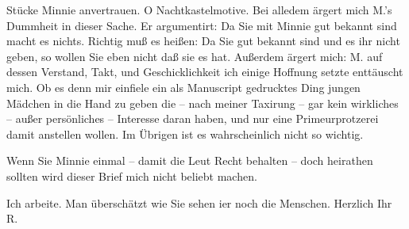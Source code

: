                Stücke Minnie anvertrauen. O
               Nachtkastelmotive. Bei alledem ärgert mich M.’s Dummheit in dieser Sache. Er argumentirt: Da Sie mit Minnie gut {\pb}bekannt sind macht es nichts. Richtig muß es heißen: Da Sie gut bekannt sind und es
               ihr nicht geben, so wollen Sie eben nicht daß sie es hat. Außerdem ärgert mich: M. auf dessen Verstand, Takt, und
               Geschicklichkeit ich einige Hoffnung setzte enttäuscht mich. Ob es denn mir einfiele
               ein als Manuscript gedrucktes Ding jungen Mädchen in die Hand zu geben die – nach meiner Taxirung –
               gar kein wirkliches – außer persönliches – Interesse daran haben, und nur eine
               Primeurprotzerei damit anstellen wollen. Im Übrigen ist es wahrscheinlich nicht so
               wichtig.\pend
           
\pstart
           Wenn Sie Minnie einmal – damit die Leut Recht
               behalten – doch heirathen sollten wird dieser Brief mich nicht beliebt machen.\pend
           
\pstart
           Ich arbeite. Man überschätzt wie Sie sehen i{\geminationm}er noch die
               Menschen. Herzlich Ihr \spacefill\mbox{R.}\pend
           \endnumbering{}  \newcommand{\dateiname}{L01053}\newcommand{\titel}{Richard Beer-Hofmann an Arthur Schnitzler, 13. 7. 1900}\newcommand{\editorInnen}{Martin Anton Müller und Gerd-Hermann Susen}
